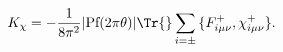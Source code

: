 \begin{equation}\label{eq:kchi}
 K_\chi=-\frac{1}{8\pi^2}|\text{Pf}(2\pi\theta)|
 \Tr{}\sum_{i=\pm}\,\{F^+_{i\mu\nu},\chi^+_{i\mu\nu}\}.
\end{equation}

